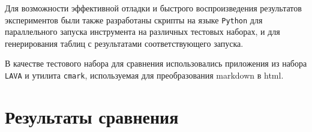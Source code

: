 Для возможности эффективной отладки и быстрого воспроизведения результатов экспериментов были также разработаны скрипты на языке \texttt{Python} для параллельного запуска инструмента на различных тестовых наборах, и для генерирования таблиц с результатами соответствующего запуска.

В качестве тестового набора для сравнения использовались приложения из набора \texttt{LAVA} \cite{LAVA} и утилита \texttt{cmark}, используемая для преобразования markdown в html.


\section{Результаты сравнения}



